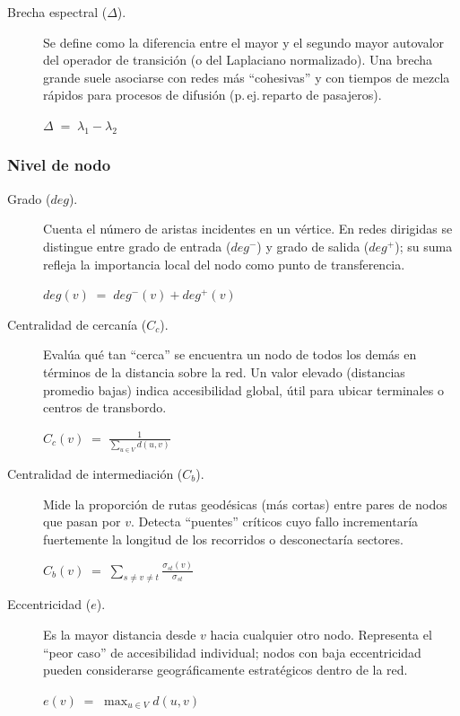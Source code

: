 \documentclass[11pt]{article}
\begin{document}
\begin{description}
		\item[Brecha espectral ($\Delta$).]
		Se define como la diferencia entre el mayor y el segundo mayor autovalor del operador de transición (o del Laplaciano normalizado). Una brecha grande suele asociarse con redes más “cohesivas” y con tiempos de mezcla rápidos para procesos de difusión (p.\,ej.\,reparto de pasajeros).
		\begin{center}
		$\displaystyle \Delta \;=\; \lambda_{1} - \lambda_{2}$
		\end{center}

		\end{description}

		\subsubsection*{Nivel de nodo}

		\begin{description}

		\item[Grado ($deg$).]
		Cuenta el número de aristas incidentes en un vértice. En redes dirigidas se distingue entre grado de entrada ($deg^{-}$) y grado de salida ($deg^{+}$); su suma refleja la importancia local del nodo como punto de transferencia.
		\begin{center}
		$\displaystyle deg(v) \;=\; deg^{-}(v) + deg^{+}(v)$
		\end{center}

		\item[Centralidad de cercanía ($C_c$).]
		Evalúa qué tan “cerca” se encuentra un nodo de todos los demás en términos de la distancia sobre la red. Un valor elevado (distancias promedio bajas) indica accesibilidad global, útil para ubicar terminales o centros de transbordo.
		\begin{center}
		$\displaystyle C_c(v) \;=\; \frac{1}{\sum_{u\in V} d(u,v)}$
		\end{center}

		\item[Centralidad de intermediación ($C_b$).]
		Mide la proporción de rutas geodésicas (más cortas) entre pares de nodos que pasan por $v$. Detecta “puentes” críticos cuyo fallo incrementaría fuertemente la longitud de los recorridos o desconectaría sectores.
		\begin{center}
		$\displaystyle C_b(v) \;=\; \sum_{s\neq v\neq t}\frac{\sigma_{st}(v)}{\sigma_{st}}$
		\end{center}

		\item[Eccentricidad ($e$).]
		Es la mayor distancia desde $v$ hacia cualquier otro nodo. Representa el “peor caso” de accesibilidad individual; nodos con baja eccentricidad pueden considerarse geográficamente estratégicos dentro de la red.
		\begin{center}
		$\displaystyle e(v) \;=\; \max_{u\in V} d(u,v)$
		\end{center}

		\end{description}
\end{document}
